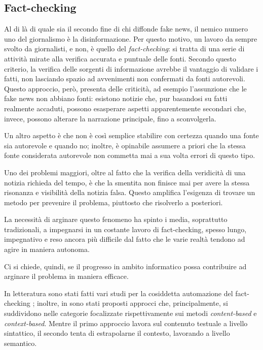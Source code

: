 \documentclass[12pt]{report}
\theoremstyle{definition}
\begin{document}
\subsection{Fact-checking} \label{factchecking}
Al di là di quale sia il secondo fine di chi diffonde fake news, il nemico numero uno del giornalismo è la disinformazione.
Per questo motivo, un lavoro da sempre svolto da giornalisti, e non, è quello del \textit{fact-checking}: si tratta di una serie di attività mirate alla verifica accurata e puntuale delle fonti.
Secondo questo criterio, la verifica delle sorgenti di informazione avrebbe il vantaggio di validare i fatti, non lasciando spazio ad avvenimenti non confermati da fonti autorevoli.
Questo approccio, però, presenta delle criticità, ad esempio l'assunzione che le fake news non abbiano fonti: 
esistono notizie che, pur basandosi su fatti realmente accaduti, possono esasperare aspetti apparentemente secondari che, invece, possono alterare la narrazione principale, fino a sconvolgerla.

Un altro aspetto è che non è così semplice stabilire con certezza quando una fonte sia autorevole e quando no; inoltre, è opinabile assumere a priori che la stessa fonte considerata autorevole non commetta mai a sua volta errori di questo tipo.

Uno dei problemi maggiori, oltre al fatto che la verifica della veridicità di una notizia richieda del tempo, è che la smentita non finisce mai per avere la stessa risonanza e visibilità della notizia falsa. Questo amplifica l'esigenza di trovare un metodo per prevenire il problema, piuttosto che risolverlo a posteriori.

La necessità di arginare questo fenomeno ha spinto i media, soprattutto tradizionali, a impegnarsi in un costante lavoro di fact-checking, spesso lungo, impegnativo e reso ancora più difficile dal fatto che le varie realtà tendono ad agire in maniera autonoma.

Ci si chiede, quindi, se il progresso in ambito informatico possa contribuire ad arginare il problema in maniera efficace.

In letteratura sono stati fatti vari studi per la cosiddetta automazione del fact-checking \cite{5, 6, 8, 9, 10, 11, 12, 13, 17}; inoltre, in \cite{15, 16, 21} sono stati proposti approcci che, principalmente, si suddividono nelle categorie focalizzate rispettivamente sui metodi \textit{content-based} e \textit{context-based}.
Mentre il primo approccio lavora sul contenuto testuale a livello sintattico, il secondo tenta di estrapolarne il contesto, lavorando a livello semantico.
\end{document}
